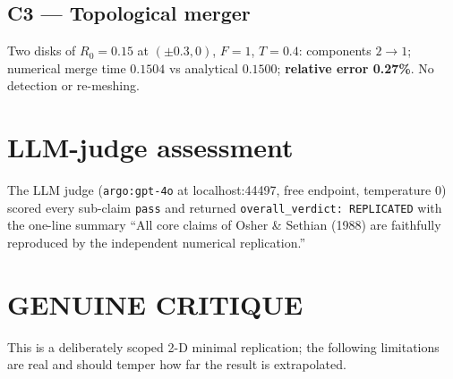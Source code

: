 \documentclass[11pt]{article}
\begin{document}
\subsection*{C3 --- Topological merger}
Two disks of $R_0=0.15$ at $(\pm 0.3,0)$, $F=1$, $T=0.4$: components
$2 \rightarrow 1$; numerical merge time $0.1504$ vs analytical
$0.1500$; \textbf{relative error 0.27\%}. No detection or re-meshing.

\section{LLM-judge assessment}
The LLM judge (\texttt{argo:gpt-4o} at localhost:44497, free endpoint,
temperature 0) scored every sub-claim \texttt{pass} and returned
\texttt{overall\_verdict: REPLICATED} with the one-line summary
``All core claims of Osher \& Sethian (1988) are faithfully reproduced by
the independent numerical replication.''

\section{GENUINE CRITIQUE}
This is a deliberately scoped 2-D minimal replication; the following
limitations are real and should temper how far the result is extrapolated.
\end{document}
